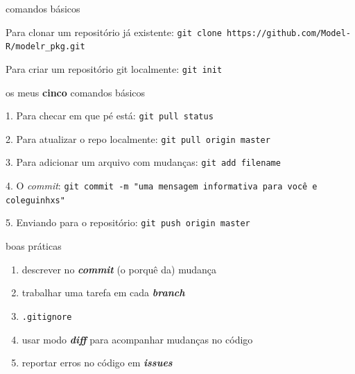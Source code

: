 \documentclass[11pt]{beamer}
\newcommand{\code}{\texttt}
\begin{document}
\begin{frame}{comandos básicos}

     \begin{block}{Para clonar um repositório já existente: }
      \code{git clone https://github.com/Model-R/modelr\_pkg.git}
      \end{block}
   \begin{block}{Para criar um repositório git localmente: }
         \code{git init}
        \end{block}



\end{frame}


\begin{frame}{os meus \textbf{cinco} comandos básicos}

     \begin{block}{1. Para checar em que pé está: }
      \code{git pull status}
      \end{block}


     \begin{block}{2. Para atualizar o repo localmente: }
      \code{git pull origin master}
      \end{block}

   \begin{block}{3. Para adicionar um arquivo com mudanças:}
         \code{git add filename}
        \end{block}
        
          \begin{block}{4. O \textit{commit}:}
         \code{git commit -m "uma mensagem informativa para você e coleguinhxs"}
        \end{block}

     \begin{block}{5. Enviando para o repositório:}
         \code{git push origin master}
        \end{block}


\end{frame}

\begin{frame}{boas práticas}

\begin{enumerate}

\pause \item descrever no \textbf{\textit{commit}} (o porquê da) mudança 

\pause \item trabalhar uma tarefa em cada \textbf{\textit{branch}}

\pause \item \code{.gitignore}

\pause \item usar modo \textit{\textbf{diff}} para acompanhar mudanças no código

\pause \item reportar erros no código em \textbf{\textit{issues}}

\end{enumerate}

\end{frame}
\end{document}
